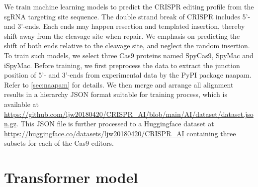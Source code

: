 \documentclass{article}
\begin{document}
We train machine learning models to predict the CRISPR editing profile from the sgRNA targeting site sequence. The double strand break of CRISPR includes 5'- and 3'-ends. Each ends may happen resection and templated insertion, thereby shift away from the cleavage site when repair. We emphasis on predicting the shift of both ends relative to the cleavage site, and neglect the random insertion. To train such models, we select three Cas9 proteins named SpyCas9, SpyMac and iSpyMac. Before training, we first preprocess the data to extract the junction position of 5'- and 3'-ends from experimental data by the PyPI package naapam. Refer to \cref{sec:naapam} for details. We then merge and arrange all alignment results in a hierarchy JSON format suitable for training process, which is available at \url{https://github.com/ljw20180420/CRISPR_AI/blob/main/AI/dataset/dataset.json.gz}. This JSON file is further processed to a Huggingface dataset at \url{https://huggingface.co/datasets/ljw20180420/CRISPR_AI} containing three subsets for each of the Cas9 editors.

\section{Transformer model}
\end{document}
